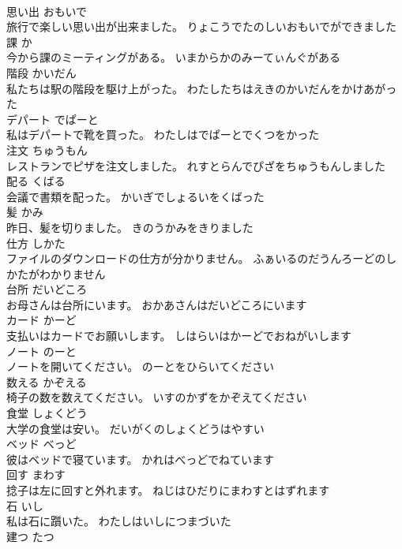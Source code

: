 \documentclass[8pt]{extreport}
\begin{document}
\begin{CJK}{UTF8}{min}
\\	思い出	おもいで	
\\	旅行で楽しい思い出が出来ました。	りょこうでたのしいおもいでができました	
\\	課	か	
\\	今から課のミーティングがある。	いまからかのみーてぃんぐがある	
\\	階段	かいだん	
\\	私たちは駅の階段を駆け上がった。	わたしたちはえきのかいだんをかけあがった	
\\	デパート	でぱーと	
\\	私はデパートで靴を買った。	わたしはでぱーとでくつをかった	
\\	注文	ちゅうもん	
\\	レストランでピザを注文しました。	れすとらんでぴざをちゅうもんしました	
\\	配る	くばる	
\\	会議で書類を配った。	かいぎでしょるいをくばった	
\\	髪	かみ	
\\	昨日、髪を切りました。	きのうかみをきりました	
\\	仕方	しかた	
\\	ファイルのダウンロードの仕方が分かりません。	ふぁいるのだうんろーどのしかたがわかりません	
\\	台所	だいどころ	
\\	お母さんは台所にいます。	おかあさんはだいどころにいます	
\\	カード	かーど	
\\	支払いはカードでお願いします。	しはらいはかーどでおねがいします	
\\	ノート	のーと	
\\	ノートを開いてください。	のーとをひらいてください	
\\	数える	かぞえる	
\\	椅子の数を数えてください。	いすのかずをかぞえてください	
\\	食堂	しょくどう	
\\	大学の食堂は安い。	だいがくのしょくどうはやすい	
\\	ベッド	べっど	
\\	彼はベッドで寝ています。	かれはべっどでねています	
\\	回す	まわす	
\\	捻子は左に回すと外れます。	ねじはひだりにまわすとはずれます	
\\	石	いし	
\\	私は石に躓いた。	わたしはいしにつまづいた	
\\	建つ	たつ	

\end{CJK}
\end{document}
